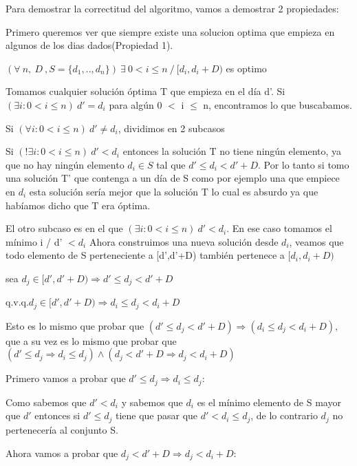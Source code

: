 Para demostrar la correctitud del algoritmo, vamos a demostrar 2 propiedades:

Primero queremos ver que siempre existe una solucion optima que empieza en algunos de los dias dados(Propiedad 1).

$(\forall \ n,\ D\ , S = \{d_1,..,d_n\} ) \ \exists \ 0 < i \leq n \ / \ [d_i,d_i + D )$ es optimo 

Tomamos cualquier solución óptima T que empieza en el día d'.
Si $(\exists i: 0 < i\leq n ) \ d' = d_i$ para algún 0 $<$ i $\leq$ n, encontramos lo que buscabamos.

Si $(\forall i: 0<i \leq n) \  d' \neq d_i$, dividimos en 2 subcasos

Si $(!\exists i: 0<i\leq n) \ d' < d_i$ entonces la solución T no tiene ningún elemento, ya que no hay ningún elemento $d_i \in S$ tal que $d' \leq d_i < d' + D$. Por lo tanto si tomo una solución T' que contenga a un día de S como por ejemplo una que empiece en $d_i$ esta solución sería mejor que la solución T lo cual es absurdo ya que habíamos dicho que T era óptima.  

El otro subcaso es en el que $(\exists i: 0<i\leq n) \ d' < d_i$. En ese caso tomamos el mínimo i / d' $< d_i$
Ahora construimos una nueva solución desde $d_i$, veamos que todo elemento de S perteneciente a [d',d'+D) también pertenece a $[d_i,d_i +D)$

sea $d_j \in [d',d'+D) \Rightarrow d' \leq d_j < d'+D $

q.v.q.$ d_j \in  [d',d'+D) \Rightarrow d_i \leq d_j < d_i+D $


Esto es lo mismo que probar que $(d' \leq d_j < d'+D) \Rightarrow (d_i \leq d_j < d_i+D) $, que a su vez es lo mismo que probar que $(d' \leq d_j \Rightarrow d_i \leq d_j) \wedge (d_j < d'+D \Rightarrow d_j < d_i+D)$

Primero vamos a probar que $d' \leq d_j \Rightarrow d_i \leq d_j$:

Como sabemos que $d' < d_i$ y sabemos que $d_i$ es el mínimo elemento de S mayor que $d'$ entonces si $d' \leq d_j$ tiene que pasar que $d' < d_i \leq d_j$, de lo contrario $d_j$ no pertenecería al conjunto S.

Ahora vamos a probar que $d_j < d'+D \Rightarrow d_j < d_i+D$:

